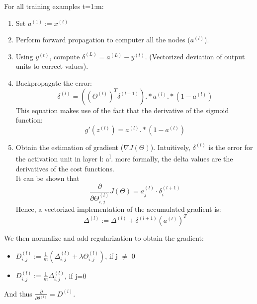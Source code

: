     For all training examples t=1:m:
    \begin{enumerate}
        \item Set $a^{(1)} := x^{(t)}$
        \item Perform forward propagation to computer all the nodes ($a^{(l)}$).
        \item Using $y^{(t)}$, compute $\delta^{(L)}=a^{(L)} -y^{(t)} $. (Vectorized deviation of output units to correct values).
        \item Backpropagate the error:
            \[
                \delta^{(l)} = ( (\Theta ^{(l)})^T \delta ^{(l+1)}) .* a^{(l)} .* (1 - a^{(l)})
            \] 
            This equation makes use of the fact that the derivative of the sigmoid function:
            \[
                g'(z^{(l)}) = a^{(l)} .* (1-a^{(l)})
            \] 
        \item Obtain the estimation of gradient ($\nabla J(\Theta)$). Intuitively, $\delta^{(l)}$ is the error for the activation unit in layer l: a\textsuperscript{l}. more formally, the delta values are the derivatives of the cost functions. \\
            It can be shown that 
            \[
                \boxed{
                \frac{\partial}{\partial \Theta^{(l)}_{i,j}} J (\Theta) = a^{(l)}_j \cdot \delta_i^{(l+1)}
            }
            \] 
            Hence, a vectorized implementation of the accumulated gradient  is:
            \[
                \Delta^{(l)} := \Delta^{(l)} + \delta^{(l+1)}(a^{(l)})^T
            \] 
    \end{enumerate}
    We then normalize and add regularization to obtain the gradient:
    \begin{itemize}
        \item $D_{i,j}^{(l)} := \frac{1}{m} (\Delta^{(l)}_{i,j} + \lambda\Theta^{(l)}_{i,j})$, if j $\neq$ 0
        \item $D_{i,j}^{(l)} := \frac{1}{m} \Delta^{(l)}_{i,j}$, if j=0

    \end{itemize}

    And thus $\frac{\partial}{\partial \theta^{(l)}} = D^{(l)}$.

